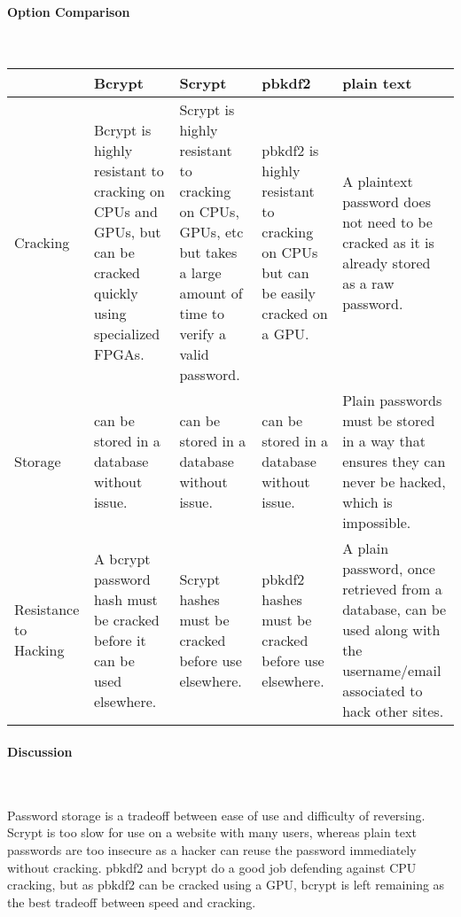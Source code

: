\documentclass[letterpaper, 10pt, draftclsnofoot, compsoc, onecolumn]{IEEEtran}
\begin{document}
{{ \par}


\newpage
\paragraph{Option Comparison} ~\\
\vspace{1pc}
\tablehead{}
\begin{supertabular}{|p{2cm}|p{2.5cm}|p{2.5cm}|p{2.5cm}|p{2.5cm}|}
\hline
  & Bcrypt
  & Scrypt
  & pbkdf2
  & plain text \\ \hline
Cracking
  & Bcrypt is highly resistant to cracking on CPUs and GPUs, but can be cracked quickly using specialized FPGAs.
  & Scrypt is highly resistant to cracking on CPUs, GPUs, etc but takes a large amount of time to verify a valid password.
  & pbkdf2 is highly resistant to cracking on CPUs but can be easily cracked on a GPU.
  & A plaintext password does not need to be cracked as it is already stored as a raw password. \\ \hline
Storage
  & can be stored in a database without issue.
  & can be stored in a database without issue.
  & can be stored in a database without issue.
  & Plain passwords must be stored in a way that ensures they can never be hacked, which is impossible. \\ \hline
Resistance to Hacking
  & A bcrypt password hash must be cracked before it can be used elsewhere.
  & Scrypt hashes must be cracked before use elsewhere.
  & pbkdf2 hashes must be cracked before use elsewhere.
  & A plain password, once retrieved from a database, can be used along with the username/email associated to hack other sites. \\ \hline 
\end{supertabular}

\paragraph{Discussion} ~\\
{\noindent
Password storage is a tradeoff between ease of use and difficulty of reversing. Scrypt is too slow for use on a website with many users,
whereas plain text passwords are too insecure as a hacker can reuse the password immediately without cracking. pbkdf2 and bcrypt do a good
job defending against CPU cracking, but as pbkdf2 can be cracked using a GPU, bcrypt is left remaining as the best tradeoff between speed and
cracking.
 \par}

}
\end{document}

